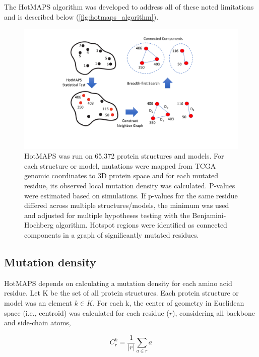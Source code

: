 The HotMAPS algorithm was developed to address all of these noted limitations and is described below (\autoref{fig:hotmaps_algorithm}).

\begin{figure}
  \centering
  \makeatletter
  \let\@currsize\normalsize
  \includegraphics[width=0.9\linewidth]{figures/chapter5/hotmaps_algorithm.pdf}
  \caption[Algorithmic flowchart for Hotspot Missense mutation Areas in Protein Structure (HotMAPS) algorithm.]{HotMAPS was run on 65,372 protein structures and models.  For each structure or model, mutations were mapped from TCGA genomic coordinates to 3D protein space and for each mutated residue, its observed local mutation density was calculated. P-values were estimated based on simulations. If p-values for the same residue differed across multiple structures/models, the minimum was used and adjusted for multiple hypotheses testing with the Benjamini-Hochberg algorithm.  Hotspot regions were identified as connected components in a graph of significantly mutated residues.}
  \label{fig:hotmaps_algorithm}
\end{figure}

\subsection{Mutation density}

HotMAPS depends on calculating a mutation density for each amino acid residue. Let K be the set of all protein structures.  Each protein structure or model was an element $k\in K$.  For each k, the center of geometry in Euclidean space (i.e., centroid) was calculated for each residue ($r$), considering all backbone and side-chain atoms,

\begin{equation}
C_r^k = \frac{1}{|r|}\sum_{a\in r}{a}
\end{equation}

